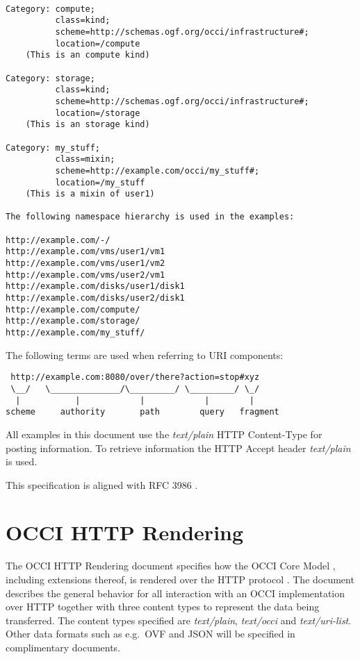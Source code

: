 \documentclass[10pt,a4paper]{article}
\begin{document}
\begin{verbatim}

Category: compute;
          class=kind;
          scheme=http://schemas.ogf.org/occi/infrastructure#;
          location=/compute 
    (This is an compute kind)

Category: storage;
          class=kind;
          scheme=http://schemas.ogf.org/occi/infrastructure#;
          location=/storage 
    (This is an storage kind)

Category: my_stuff;
          class=mixin;
          scheme=http://example.com/occi/my_stuff#;
          location=/my_stuff 
    (This is a mixin of user1)

The following namespace hierarchy is used in the examples:

http://example.com/-/
http://example.com/vms/user1/vm1
http://example.com/vms/user1/vm2
http://example.com/vms/user2/vm1
http://example.com/disks/user1/disk1
http://example.com/disks/user2/disk1
http://example.com/compute/
http://example.com/storage/
http://example.com/my_stuff/
\end{verbatim}

The following terms \cite{rfc3986} are used when referring to URI components:

\begin{verbatim}
 http://example.com:8080/over/there?action=stop#xyz
 \__/   \______________/\_________/ \_________/ \_/
  |           |            |            |        |
scheme     authority       path        query   fragment
\end{verbatim}

All examples in this document use the \emph{text/plain} HTTP
Content-Type for posting information. To retrieve information the HTTP
Accept header \emph{text/plain} is used.

This specification is aligned with RFC 3986 \cite{rfc3986}.

\section{OCCI HTTP Rendering}

The OCCI HTTP Rendering document specifies how the OCCI Core Model
\cite{occi:core}, including extensions thereof, is rendered over the HTTP
protocol \cite{rfc2616}. The document describes the general behavior for all
interaction with an OCCI implementation over HTTP together with three content
types to represent the data being transferred. The content types specified are
\textit{text/plain}, \textit{text/occi} and \textit{text/uri-list}. Other
data formats such as e.g.~OVF and JSON will be specified in complimentary
documents.
\end{document}

